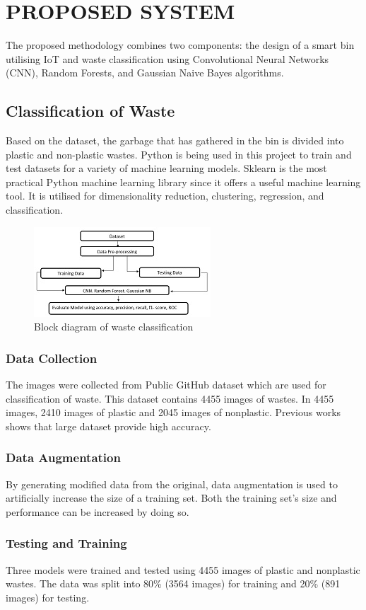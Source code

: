 
\normalsize\chapter{PROPOSED SYSTEM}
The proposed methodology combines two components: the design of a smart bin utilising IoT and waste classification using Convolutional Neural Networks (CNN), Random Forests, and Gaussian Naive Bayes algorithms.
\section{Classification of Waste}
\par Based on the dataset, the garbage that has gathered in the bin is divided into plastic and non-plastic wastes. Python is being used in this project to train and test datasets for a variety of machine learning models. Sklearn is the most practical Python machine learning library since it offers a useful machine learning tool.
It is utilised for dimensionality reduction, clustering, regression, and classification.\\
\begin{figure}
    \centering
    \includegraphics{b1.jpg}
    \caption{Block diagram of waste classification}
    \label{Block diagram of waste classification}
\end{figure}
\subsection{Data Collection}
The images were collected from Public GitHub dataset
which are used for classification of waste. This
dataset contains 4455 images of wastes. In 4455 images,
2410 images of plastic and 2045 images of nonplastic.
Previous works shows that large dataset provide
high accuracy.
\subsection{Data Augmentation}
By generating modified data from the original, data augmentation is used to artificially increase the size of a training set. Both the training set's size and performance can be increased by doing so.
\subsection{Testing and Training}
Three models were trained and tested using 4455
images of plastic and nonplastic wastes. The data
was split into 80\% (3564 images) for training and
20\% (891 images) for testing.
